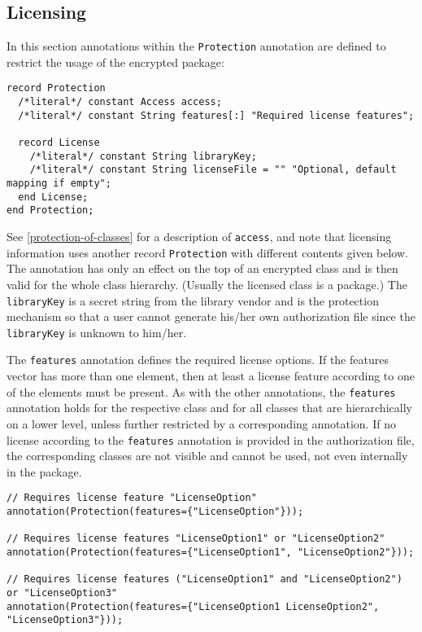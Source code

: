 \subsection{Licensing}\label{licensing}

In this section annotations within the \lstinline!Protection! annotation are defined to restrict the usage of the encrypted package:
\begin{lstlisting}[language=modelica]
record Protection
  /*literal*/ constant Access access;
  /*literal*/ constant String features[:] "Required license features";

  record License
    /*literal*/ constant String libraryKey;
    /*literal*/ constant String licenseFile = "" "Optional, default mapping if empty";
  end License;
end Protection;
\end{lstlisting}
See \cref{protection-of-classes} for a description of \lstinline!access!, and note that licensing information uses another record \lstinline!Protection! with different contents given below.
The  annotation has only an effect on the top of an encrypted class and is then valid for the whole class hierarchy.
(Usually the licensed class is a package.)
The \lstinline!libraryKey! is a secret string from the library vendor and is the protection mechanism so that a user cannot generate his/her own authorization file since the \lstinline!libraryKey! is unknown to him/her.

The \lstinline!features! annotation defines the required license options.
If the features vector has more than one element, then at least a license feature according to one of the elements must be present.
As with the other annotations, the \lstinline!features! annotation holds for the respective class and for all classes that are hierarchically on a lower level, unless further restricted by a corresponding annotation.
If no license according to the \lstinline!features! annotation is provided in the authorization file, the corresponding classes are not visible and cannot be used, not even internally in the package.

\begin{example}
\begin{lstlisting}[language=modelica]
// Requires license feature "LicenseOption"
annotation(Protection(features={"LicenseOption"}));

// Requires license features "LicenseOption1" or "LicenseOption2"
annotation(Protection(features={"LicenseOption1", "LicenseOption2"}));

// Requires license features ("LicenseOption1" and "LicenseOption2") or "LicenseOption3"
annotation(Protection(features={"LicenseOption1 LicenseOption2", "LicenseOption3"}));
\end{lstlisting}
\end{example}

